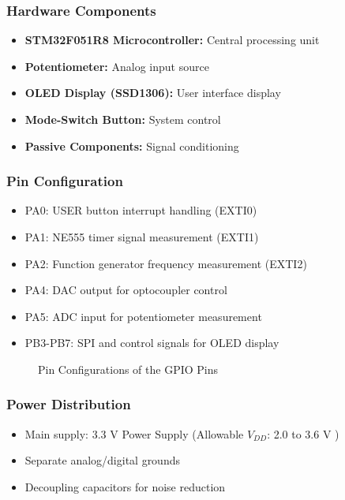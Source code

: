 \subsubsection{Hardware Components~\cite{lab-manual}}
\begin{itemize}
    \item \textbf{STM32F051R8 Microcontroller:} Central processing unit
    \item \textbf{Potentiometer:} Analog input source
    \item \textbf{OLED Display (SSD1306):} User interface display
    \item \textbf{Mode-Switch Button:} System control
    \item \textbf{Passive Components:} Signal conditioning
\end{itemize}

\subsubsection{Pin Configuration~\cite{lab-manual}}
\begin{itemize}
     \item PA0: USER button interrupt handling (EXTI0) 
     \item PA1: NE555 timer signal measurement (EXTI1)
     \item PA2: Function generator frequency measurement (EXTI2)
    \item PA4: DAC output for optocoupler control
    \item PA5: ADC input for potentiometer measurement
    \item PB3-PB7: SPI and control signals for OLED display
\end{itemize}

\begin{figure}[H]
    \centering
    
    \caption{Pin Configurations of the GPIO Pins \cite{lab-manual}}
    \label{fig:pinconfig}
\end{figure}

\subsubsection{Power Distribution}
\begin{itemize}
    \item Main supply: 3.3 V Power Supply (Allowable $V_{DD}$: 2.0 to 3.6 V \cite{stm32-datasheet})
    \item Separate analog/digital grounds
    \item Decoupling capacitors for noise reduction
\end{itemize}

